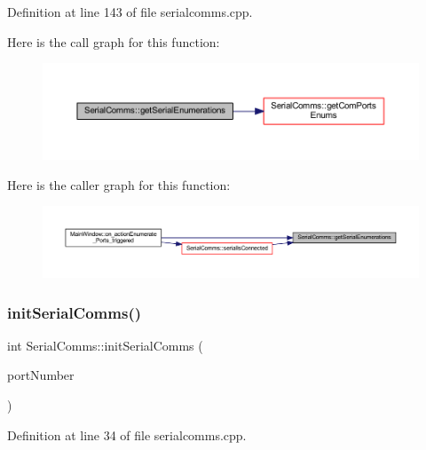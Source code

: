 Definition at line 143 of file serialcomms.\+cpp.

Here is the call graph for this function\+:
\nopagebreak
\begin{figure}[H]
\begin{center}
\leavevmode
\includegraphics[width=350pt]{class_serial_comms_ab11ec2f342fc8543e7974a843fad67dd_cgraph}
\end{center}
\end{figure}
Here is the caller graph for this function\+:
\nopagebreak
\begin{figure}[H]
\begin{center}
\leavevmode
\includegraphics[width=350pt]{class_serial_comms_ab11ec2f342fc8543e7974a843fad67dd_icgraph}
\end{center}
\end{figure}
\mbox{\label{class_serial_comms_aacd1dbe02e7eee87c7d75fc2049e71f4}} 
\subsubsection{\texorpdfstring{initSerialComms()}{initSerialComms()}}
{\footnotesize\ttfamily int Serial\+Comms\+::init\+Serial\+Comms (\begin{DoxyParamCaption}\item[{Q\+String}]{port\+Number }\end{DoxyParamCaption})\hspace{0.3cm}{\ttfamily [private]}}



Definition at line 34 of file serialcomms.\+cpp.

